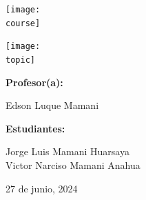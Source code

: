 \documentclass[10pt, a4paper]{article}
\newcommand{\course}{img/data_structures.png}
\newcommand{\topic}{img/trie_tree.png}
\newcommand{\professor}{Edson Luque Mamani}
\newcommand{\students}{Jorge Luis Mamani Huarsaya\\Victor Narciso Mamani Anahua}
\newcommand{\mydate}{27 de junio, 2024}
\begin{document}
\begin{titlepage}
	\centering
	\texttt{[image: \\course]} \par
  \vfill \vfill
	\texttt{[image: \\topic]}\par
  \vfill \vfill
  {\textbf{Profesor(a):} \par}
	\professor \vfill
  {\textbf{Estudiantes:} \par}
	\students \vfill
	{\large \mydate \par}
\end{titlepage}
\end{document}
